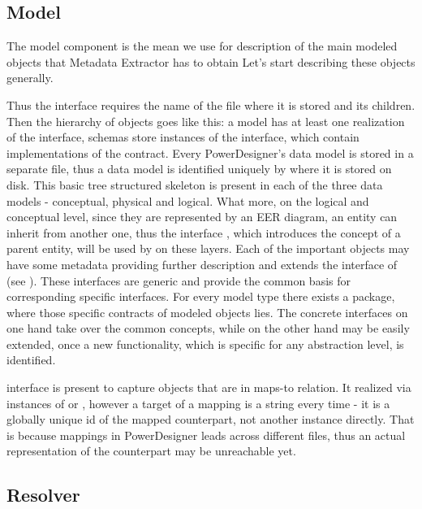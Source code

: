 \subsection{Model}

The model component is the mean we use for description of the main modeled objects that Metadata Extractor has to obtain
Let's start describing these objects generally.

Thus the  interface requires the name of the file where it is stored and its children.
Then the hierarchy of objects goes like this: a model has at least one realization of the  interface, schemas store instances of the  interface, which contain implementations of the  contract.
Every PowerDesigner's data model is stored in a separate file, thus a data model is identified uniquely by where it is stored on disk.
This basic tree structured skeleton is present in each of the three data models - conceptual, physical and logical. 
What more, on the logical and conceptual level, since they are represented by an EER diagram, an entity can inherit from another one, thus the interface , which introduces the concept of a parent entity, will be used by on these layers. 
Each of the important objects may have some metadata providing further description and extends the interface of  (see ).
These interfaces are generic and provide the common basis for corresponding specific interfaces.
For every model type there exists a package, where those specific contracts of modeled objects lies. 
The concrete interfaces on one hand take over the common concepts, while on the other hand may be easily extended, once a new functionality, which is specific for any abstraction level, is identified.

 interface is present to capture objects that are in maps-to relation. It realized via instances of  or , however a target of a mapping is a string every time - it is a globally unique id of the mapped counterpart, not another instance directly. That is because mappings in PowerDesigner leads across different files, thus an actual representation of the counterpart may be unreachable yet.

\subsection{Resolver}

